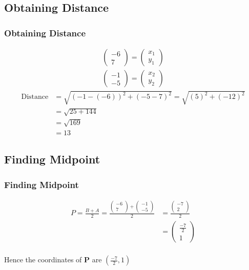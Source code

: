 \documentclass{beamer}
\providecommand{\brak}[1]{\ensuremath{\left(#1\right)}}
\theoremstyle{remark}
\newcommand{\myvec}[1]{\ensuremath{\begin{pmatrix}#1\end{pmatrix}}}
\let\vec\mathbf
\numberwithin{equation}{section}
\begin{document}
\subsection{Obtaining Distance}
\begin{frame}
\frametitle{Obtaining Distance}
\begin{align}
	\myvec{-6\\7} =\myvec{x_1\\y_1} \\
    \myvec{-1\\-5} =\myvec{x_2\\y_2} 
    \end{align}
    \begin{align}
   \text{Distance} &= \sqrt{(-1 - (-6))^2 + (-5 - 7)^2} = \sqrt{(5)^2 + (-12)^2} \\ &= \sqrt{25 + 144} \\&= \sqrt{169}\\ &= 13
\end{align}
\end{frame}
\subsection{Finding Midpoint}
\begin{frame}
\frametitle{Finding Midpoint}

\begin{align}
P=\frac{B+A}{2}=\frac{\myvec{-6\\7}+\myvec{-1\\-5}}{2}&=\frac{\myvec{-7\\2}}{2}\\ &=\myvec{\frac{-7}{2}\\1}\\
\end{align}

Hence the coordinates of $\vec{P}$ are $\brak{\frac{-7}{2},1}$



\end{frame}
\end{document}
